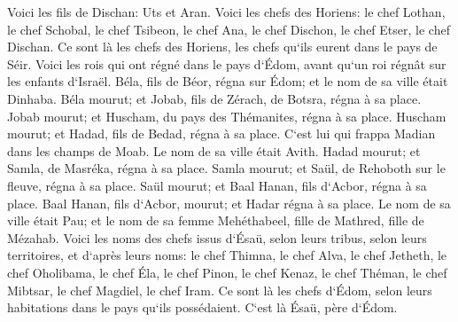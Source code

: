 \verse Voici les fils de Dischan: Uts et Aran. 
\verse Voici les chefs des Horiens: le chef Lothan, le chef Schobal, le chef Tsibeon, le chef Ana, 
\verse le chef Dischon, le chef Etser, le chef Dischan. Ce sont là les chefs des Horiens, les chefs qu`ils eurent dans le pays de Séir. 
\verse Voici les rois qui ont régné dans le pays d`Édom, avant qu`un roi régnât sur les enfants d`Israël. 
\verse Béla, fils de Béor, régna sur Édom; et le nom de sa ville était Dinhaba. 
\verse Béla mourut; et Jobab, fils de Zérach, de Botsra, régna à sa place. 
\verse Jobab mourut; et Huscham, du pays des Thémanites, régna à sa place. 
\verse Huscham mourut; et Hadad, fils de Bedad, régna à sa place. C`est lui qui frappa Madian dans les champs de Moab. Le nom de sa ville était Avith. 
\verse Hadad mourut; et Samla, de Masréka, régna à sa place. 
\verse Samla mourut; et Saül, de Rehoboth sur le fleuve, régna à sa place. 
\verse Saül mourut; et Baal Hanan, fils d`Acbor, régna à sa place. 
\verse Baal Hanan, fils d`Acbor, mourut; et Hadar régna à sa place. Le nom de sa ville était Pau; et le nom de sa femme Mehéthabeel, fille de Mathred, fille de Mézahab. 
\verse Voici les noms des chefs issus d`Ésaü, selon leurs tribus, selon leurs territoires, et d`après leurs noms: le chef Thimna, le chef Alva, le chef Jetheth, 
\verse le chef Oholibama, le chef Éla, le chef Pinon, 
\verse le chef Kenaz, le chef Théman, le chef Mibtsar, 
\verse le chef Magdiel, le chef Iram. Ce sont là les chefs d`Édom, selon leurs habitations dans le pays qu`ils possédaient. C`est là Ésaü, père d`Édom. 

\chapter{}

